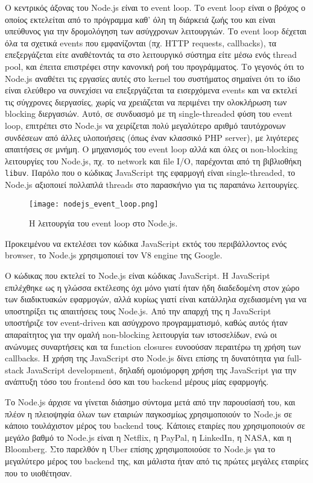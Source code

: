 \documentclass[../thesis.tex]{subfiles}
\begin{document}
Ο κεντρικός άξονας του Node.js είναι το event loop.
Το event loop είναι ο βρόχος ο οποίος εκτελείται από το πρόγραμμα καθ' όλη τη διάρκειά ζωής του και είναι υπεύθυνος για την δρομολόγηση των ασύγχρονων λειτουργιών.
Το event loop δέχεται όλα τα σχετικά events που εμφανίζονται (πχ. HTTP requests, callbacks), τα επεξεργάζεται είτε αναθέτοντάς τα στο λειτουργικό σύστημα είτε μέσω ενός thread pool, και έπειτα επιστρέφει στην κανονική ροή του προγράμματος\cite{node_docs_eventloop}. 
Το γεγονός ότι το Node.js αναθέτει τις εργασίες αυτές στο kernel του συστήματος σημαίνει ότι το ίδιο είναι ελεύθερο να συνεχίσει να επεξεργάζεται τα εισερχόμενα events και να εκτελεί τις σύγχρονες διεργασίες, χωρίς να χρειάζεται να περιμένει την ολοκλήρωση των blocking διεργασιών.
Αυτό, σε συνδυασμό με τη single-threaded φύση του event loop, επιτρέπει στο Node.js να χειρίζεται πολύ μεγαλύτερο αριθμό ταυτόχρονων συνδέσεων από άλλες υλοποιήσεις (όπως έναν κλασσικό PHP server), με λιγότερες απαιτήσεις σε μνήμη.
Ο μηχανισμός του event loop αλλά και όλες οι non-blocking λειτουργίες του Node.js, πχ. το network και file I/O, παρέχονται από τη βιβλιοθήκη \texttt{libuv}.
Παρόλο που ο κώδικας JavaScript της εφαρμογή είναι single-threaded, το Node.js αξιοποιεί πολλαπλά threads στο παρασκήνιο για τις παραπάνω λειτουργίες.

\begin{figure}[!ht]
    \texttt{[image: nodejs\_event\_loop.png]}
    \centering
    \caption{Η λειτουργία του event loop στο Node.js\cite{node_eventloop_diagram}.}
\end{figure}


Προκειμένου να εκτελέσει τον κώδικα JavaScript εκτός του περιβάλλοντος ενός browser, το Node.js χρησιμοποιεί τον V8 engine της Google.

Ο κώδικας που εκτελεί το Node.js είναι κώδικας JavaScript.
Η JavaScript επιλέχθηκε ως η γλώσσα εκτέλεσης όχι μόνο γιατί ήταν ήδη διαδεδομένη στον χώρο των διαδικτυακών εφαρμογών, αλλά κυρίως γιατί είναι κατάλληλα σχεδιασμένη για να υποστηρίξει τις απαιτήσεις τους Node.js.
Από την απαρχή της η JavaScript υποστήριζε τον event-driven και ασύγχρονο προγραμματισμό, καθώς αυτός ήταν απαραίτητος για την ομαλή non-blocking λειτουργία των ιστοσελίδων, ενώ οι ανώνυμες συναρτήσεις και τα function closures ευνοούσαν περαιτέρω τη χρήση των callbacks.
Η χρήση της JavaScript στο Node.js δίνει επίσης τη δυνατότητα για full-stack JavaScript development, δηλαδή ομοιόμορφη χρήση της JavaScript για την ανάπτυξη τόσο του frontend όσο και του backend μέρους μίας εφαρμογής.

Το Node.js άρχισε να γίνεται διάσημο σύντομα μετά από την παρουσίασή του, και πλέον η πλειοψηφία όλων των εταιριών παγκοσμίως χρησιμοποιούν το Node.js σε κάποιο τουλάχιστον μέρος του backend τους.
Κάποιες εταιρίες που χρησιμοποιούν σε μεγάλο βαθμό το Node.js είναι η Netflix\cite{netflix}, η PayPal\cite{paypal}, η LinkedIn\cite{linkedIn}, η NASA\cite{nasa}, και η Bloomberg\cite{bloomberg}.
Στο παρελθόν η Uber επίσης χρησιμοποιούσε το Node.js για το μεγαλύτερο μέρος του backend της, και μάλιστα ήταν από τις πρώτες μεγάλες εταιρίες που το υιοθέτησαν\cite{uberNode}.
\end{document}
